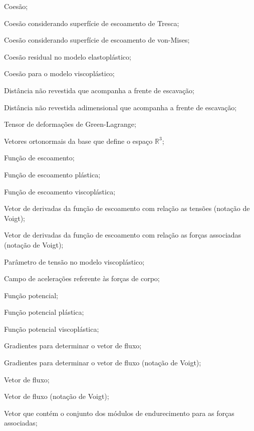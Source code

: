 

\item[\textbf{Latino minúsculo:}]
\item[$c$]				Coesão;
\item[$c_{TR}$]			Coesão considerando superfície de escoamento de Tresca;
\item[$c_{VM}$]			Coesão considerando superfície de escoamento de von-Mises;
\item[$c_0$]			Coesão residual no modelo elastoplástico;
\item[$c_1$]			Coesão para o modelo viscoplástico;
\item[$d_0$]			Distância não revestida que acompanha a frente de escavação;
\item[$d_0^*$]			Distância não revestida adimensional que acompanha a frente de escavação;
\item[$ \greenll $] 	Tensor de deformações de Green-Lagrange;
\item[$\euml, \edoisl, \etresl$] Vetores ortonormais da base que define o espaço $\mathbb{R}^3$;
\item[$f$]				Função de escoamento;
\item[$f^p$]				Função de escoamento plástica;
\item[$f^{vp}$]				Função de escoamento viscoplástica;
\item[$\dfdsl$]			Vetor de derivadas da função de escoamento com relação as tensões (notação de Voigt);
\item[$\dfdql$]			Vetor de derivadas da função de escoamento com relação as forças associadas (notação de Voigt);
\item[$f_0$]			Parâmetro de tensão no modelo viscoplástico;
\item[$\fl$]					Campo de acelerações referente às forças de corpo;
\item[$g$]				Função potencial;
\item[$g^p$]				Função potencial plástica;
\item[$g^{vp}$]				Função potencial viscoplástica;
\item[$\gllum, \glldois, \glltres$] Gradientes para determinar o vetor de fluxo;
\item[$\gl_1, \gl_2, \gl_3$] Gradientes para determinar o vetor de fluxo (notação de Voigt);
\item[$\dgdsll$]		Vetor de fluxo;
\item[$\dgdsl$]			Vetor de fluxo (notação de Voigt);
\item[$\hl$]			Vetor que contém o conjunto dos módulos de endurecimento para as forças associadas;
